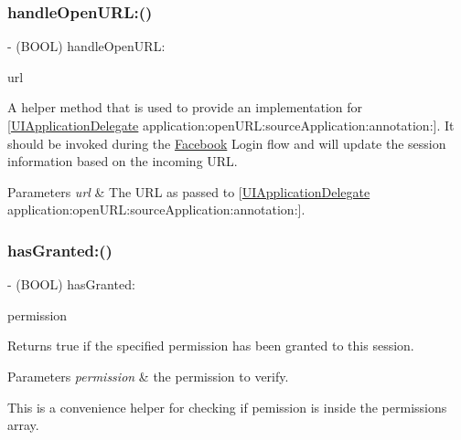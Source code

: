 \subsubsection{\texorpdfstring{handle\+Open\+U\+R\+L\+:()}{handleOpenURL:()}\hspace{0.1cm}{\footnotesize\ttfamily [5/5]}}
{\footnotesize\ttfamily -\/ (B\+O\+OL) handle\+Open\+U\+R\+L\+: \begin{DoxyParamCaption}\item[{(N\+S\+U\+RL $\ast$)}]{url }\end{DoxyParamCaption}}

A helper method that is used to provide an implementation for \mbox{[}\hyperlink{classUIApplicationDelegate-p}{U\+I\+Application\+Delegate} application\+:open\+U\+R\+L\+:source\+Application\+:annotation\+:\mbox{]}. It should be invoked during the \hyperlink{interfaceFacebook}{Facebook} Login flow and will update the session information based on the incoming U\+RL.


\begin{DoxyParams}{Parameters}
{\em url} & The U\+RL as passed to \mbox{[}\hyperlink{classUIApplicationDelegate-p}{U\+I\+Application\+Delegate} application\+:open\+U\+R\+L\+:source\+Application\+:annotation\+:\mbox{]}. \\
\hline
\end{DoxyParams}
\mbox{\label{interfaceFBSession_aa74d6239fcde1f9d6dd9530538eb691b}} 
\subsubsection{\texorpdfstring{has\+Granted\+:()}{hasGranted:()}\hspace{0.1cm}{\footnotesize\ttfamily [1/5]}}
{\footnotesize\ttfamily -\/ (B\+O\+OL) has\+Granted\+: \begin{DoxyParamCaption}\item[{(N\+S\+String $\ast$)}]{permission }\end{DoxyParamCaption}}

Returns true if the specified permission has been granted to this session.


\begin{DoxyParams}{Parameters}
{\em permission} & the permission to verify.\\
\hline
\end{DoxyParams}
This is a convenience helper for checking if {\ttfamily pemission} is inside the permissions array. \mbox{\label{interfaceFBSession_aa74d6239fcde1f9d6dd9530538eb691b}} 
